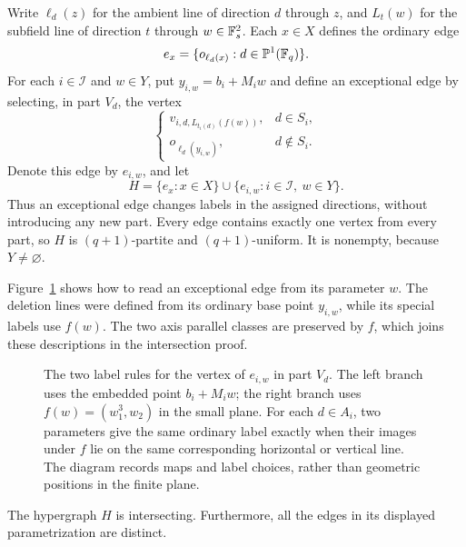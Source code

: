 Write \(\ell_d(z)\) for the ambient line of direction \(d\)
through \(z\), and \(L_t(w)\) for the subfield line of direction
\(t\) through \(w\in\mathbb F_s^2\).  Each \(x\in X\) defines the
ordinary edge
\[
 e_x=\{o_{\ell_d(x)}:d\in\mathbb P^1(\mathbb F_q)\}.
\]
For each \(i\in\mathcal I\) and \(w\in Y\), put
\(y_{i,w}=b_i+M_iw\) and define an exceptional edge by selecting,
in part \(V_d\), the vertex
\begin{equation}
\label{con-exceptional-vertex}
 \begin{cases}
 v_{i,d,L_{t_i(d)}(f(w))},& d\in S_i,\\
 o_{\ell_d(y_{i,w})},&d\notin S_i.
 \end{cases}
\end{equation}
Denote this edge by \(e_{i,w}\), and let
\[
 H=\{e_x:x\in X\}\cup
   \{e_{i,w}:i\in\mathcal I,\ w\in Y\}.
\]
Thus an exceptional edge changes labels in the assigned directions,
without introducing any new part.  Every edge contains exactly one
vertex from every part, so \(H\)
is \((q+1)\)-partite and \((q+1)\)-uniform.  It is nonempty,
because \(Y\ne\varnothing\).

Figure~\ref{fig:two-coordinates} shows how to read an exceptional
edge from its parameter \(w\).  The deletion lines were defined from
its ordinary base point \(y_{i,w}\), while its special labels use
\(f(w)\).  The two axis parallel classes are preserved by \(f\),
which joins these descriptions in the intersection proof.

\begin{figure}[htbp]
\centering

\caption{The two label rules for the vertex of \(e_{i,w}\) in part
\(V_d\).  The left branch uses the embedded point \(b_i+M_iw\);
the right branch uses \(f(w)=(w_1^3,w_2)\) in the small plane.
For each \(d\in A_i\), two parameters give the same ordinary label
exactly when their images under \(f\) lie on the same corresponding
horizontal or vertical line.
The diagram records maps and label choices, rather than geometric
positions in the finite plane.}
\label{fig:two-coordinates}
\end{figure}

\begin{proposition}
\label{con-intersection}
The hypergraph \(H\) is intersecting.  Furthermore, all the edges
in its displayed parametrization are distinct.
\end{proposition}

